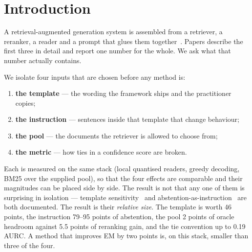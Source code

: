 ﻿\documentclass[11pt]{article}
\begin{document}
\section{Introduction}

A retrieval-augmented generation system is assembled from a retriever, a reranker, a reader and
a prompt that glues them together~\cite{lewis2020rag,gao2023survey}. Papers describe the first
three in detail and report one number for the whole. We ask what that number actually contains.

We isolate four inputs that are chosen before any method is:

\begin{enumerate}
\item \textbf{the template} --- the wording the framework ships and the practitioner copies;
\item \textbf{the instruction} --- sentences inside that template that change behaviour;
\item \textbf{the pool} --- the documents the retriever is allowed to choose from;
\item \textbf{the metric} --- how ties in a confidence score are broken.
\end{enumerate}

Each is measured on the same stack (local quantised readers, greedy decoding, BM25 over the
supplied pool), so that the four effects are comparable and their magnitudes can be placed side
by side. The result is not that any one of them is surprising in isolation --- template
sensitivity~\cite{sclar2024quantifying,voronov2024mind,mizrahi2024state,hua2025flaw} and
abstention-as-instruction~\cite{abstention2025} are both documented. The result is their
\emph{relative size}. The template is worth 46 points, the instruction 79--95 points of
abstention, the pool 2 points of oracle headroom against 5.5 points of reranking gain, and the
tie convention up to 0.19 AURC. A method that improves EM by two points is, on this stack,
smaller than three of the four.
\end{document}
